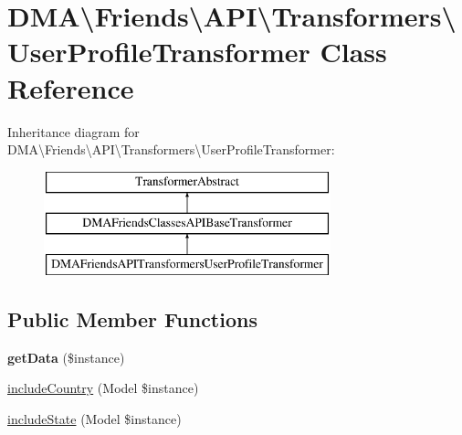 \hypertarget{classDMA_1_1Friends_1_1API_1_1Transformers_1_1UserProfileTransformer}{}\section{D\+M\+A\textbackslash{}Friends\textbackslash{}A\+P\+I\textbackslash{}Transformers\textbackslash{}User\+Profile\+Transformer Class Reference}
\label{classDMA_1_1Friends_1_1API_1_1Transformers_1_1UserProfileTransformer}
Inheritance diagram for D\+M\+A\textbackslash{}Friends\textbackslash{}A\+P\+I\textbackslash{}Transformers\textbackslash{}User\+Profile\+Transformer\+:\begin{figure}[H]
\begin{center}
\leavevmode
\includegraphics[height=3.000000cm]{d6/d08/classDMA_1_1Friends_1_1API_1_1Transformers_1_1UserProfileTransformer}
\end{center}
\end{figure}
\subsection*{Public Member Functions}
\begin{DoxyCompactItemize}
\item 
\hypertarget{classDMA_1_1Friends_1_1API_1_1Transformers_1_1UserProfileTransformer_ada552f9a08e428c52c044ca8e7abc915}{}{\bfseries get\+Data} (\$instance)\label{classDMA_1_1Friends_1_1API_1_1Transformers_1_1UserProfileTransformer_ada552f9a08e428c52c044ca8e7abc915}

\item 
\hyperlink{classDMA_1_1Friends_1_1API_1_1Transformers_1_1UserProfileTransformer_aaea113bbd8cf8bd53b6ef3530d3fc07a}{include\+Country} (Model \$instance)
\item 
\hyperlink{classDMA_1_1Friends_1_1API_1_1Transformers_1_1UserProfileTransformer_accd7c7ec420193cbaa6077b26aa8d292}{include\+State} (Model \$instance)
\end{DoxyCompactItemize}
